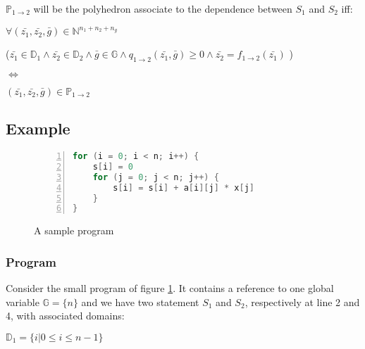 $\mathbb{P}_{1 \rightarrow 2}$ will be the polyhedron associate to the dependence between $S_{1}$ and $S_{2}$ iff:
%
%
%
\begin{center}
$\forall (\bar{z_{1}}, \bar{z_{2}}, \bar{g}) \in \mathbb{N}^{n_{1} + n_{2} + n_{g}}$

($\bar{z_{1}} \in \mathbb{D}_{1} \wedge \bar{z_{2}} \in \mathbb{D}_{2} \wedge \bar{g} \in \mathbb{G} \wedge q_{1 \rightarrow 2}(\bar{z_{1}}, \bar{g}) \geq 0 \wedge \bar{z_{2}} = f_{1 \rightarrow 2}(\bar{z_{1}})$ )

$\Leftrightarrow$

$(\bar{z_{1}}, \bar{z_{2}}, \bar{g}) \in \mathbb{P}_{1 \rightarrow 2}$
\end{center}

		\subsection{Example}

\begin{figure}[!h]	
\begin{lstlisting}[language=C, numbers=left]
for (i = 0; i < n; i++) {
    s[i] = 0
    for (j = 0; j < n; j++) {
        s[i] = s[i] + a[i][j] * x[j]
    }
}
\end{lstlisting}
\caption{A sample program}
\label{polyhedric:sampleprogram}
\end{figure}

			\subsubsection{Program}

Consider the small program of figure \ref{polyhedric:sampleprogram}. It contains a reference to one global variable
$\mathbb{G} = \{ n \}$ and we have two statement $S_{1}$ and $S_{2}$, respectively at line 2 and 4, with associated domains:

$\mathbb{D}_{1} = \{ i | 0 \leq i \leq n - 1 \}$ 

